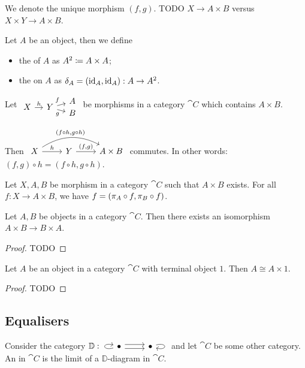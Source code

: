 We denote the unique morphism $(f,g)$. TODO $X\to A\times B$ versus $X\times Y \to A\times B$.

\begin{definition}
Let $A$ be an object, then we define
\begin{itemize}
\item the  of $A$ as $A^2 \coloneqq A\times A$;
\item the  on $A$ as $\delta_A = (\operatorname{id}_A, \operatorname{id}_A): A\to A^2$.
\end{itemize}
\end{definition}

\begin{lemma} \label{compositionProjectionMorphisms}
Let $\begin{tikzcd}[row sep=-0.7em, column sep=1em]
&& A \\
X \ar[r, "h"] & Y \ar[ur, "f"] \ar[dr, swap, "g"] & \\
&& B
\end{tikzcd}$ be morphisms in a category $\cat{C}$ which contains $A\times B$.

Then
$\begin{tikzcd}
X \ar[r, "h"] \ar[rr, bend left, "{(f\circ h,g \circ h)}"] & Y \ar[r, "{(f,g)}"] & A\times B
\end{tikzcd}$ commutes.
In other words: $(f,g)\circ h = (f\circ h, g\circ h)$.
\end{lemma}

\begin{lemma} \label{productFactorisationMorphisms}
Let $X,A,B$ be morphism in a category $\cat{C}$ such that $A\times B$ exists. For all $f: X\to A\times B$, we have $f = (\pi_A\circ f, \pi_B\circ f)$.
\end{lemma}

\begin{lemma}
Let $A,B$ be objects in a category $\cat{C}$. Then there exists an isomorphism $A\times B \to B\times A$.
\end{lemma}
\begin{proof}
TODO
\end{proof}

\begin{lemma}
Let $A$ be an object in a category $\cat{C}$ with terminal object $1$. Then $A \cong A\times 1$.
\end{lemma}
\begin{proof}
TODO
\end{proof}

\subsection{Equalisers}
\begin{definition}
Consider the category $\mathbb{D}: \begin{tikzcd}
\bullet \ar[loop left] \ar[r, shift left] \ar[r, shift right] & \bullet \ar[loop right]
\end{tikzcd}$ and let $\cat{C}$ be some other category. An  in $\cat{C}$ is the limit of a $\mathbb{D}$-diagram in $\cat{C}$.
\end{definition}

